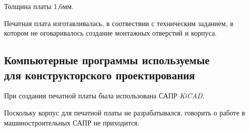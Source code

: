 Толщина платы 1,6мм.

Печатная плата изготавливалась,
в соотвествии с техническим заданием,
в котором не оговаривалось создание монтажных отверстий и корпуса.



\subsection{Компьютерные программы используемые\\
  для конструкторского проектирования}

При создании печатной платы была использована САПР \textit{KiCAD}.

Поскольку корпус для печатной платы не разрабатывался,
говорить о работе в машиностроительных САПР не приходится.


\newpage

